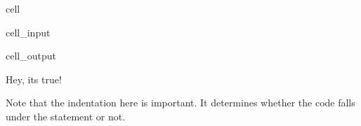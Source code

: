 \documentclass[letterpaper,10pt,english]{jupyterBook}
\begin{document}
\begin{sphinxuseclass}{cell}\begin{sphinxVerbatimInput}

\begin{sphinxuseclass}{cell_input}
\begin{sphinxVerbatim}[commandchars=\\\{\}]
 

 
\end{sphinxVerbatim}

\end{sphinxuseclass}\end{sphinxVerbatimInput}
\begin{sphinxVerbatimOutput}

\begin{sphinxuseclass}{cell_output}
\begin{sphinxVerbatim}[commandchars=\\\{\}]
Hey, it\PYGZsq{}s true!
\end{sphinxVerbatim}

\end{sphinxuseclass}\end{sphinxVerbatimOutput}

\end{sphinxuseclass}
\sphinxAtStartPar
Note that the indentation here is important.
It determines whether the code falls under the  statement or not.
\end{document}
